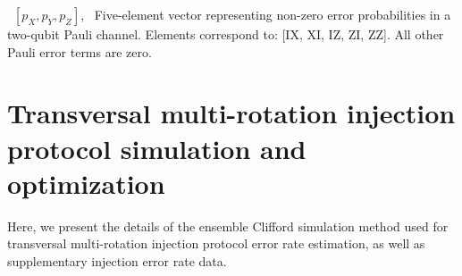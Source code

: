 \documentclass[aps, prx, reprint, superscriptaddress, longbibliography, floatfix]{revtex4-2}
\begin{document}
\begin{table}[htbp]
\centering
\caption{Extracted logical noise model for Clifford operations in distance-7 surface code. Simulations performed at physical error rate $p_{\text{ph}} \approx 7.3 \times 10^{-4}$ (10$\times$ improvement over current experimental noise rates).}
\vspace{2pt}
\dag~$[p_X,p_Y,p_Z]$, \quad
\ddag~Five-element vector representing non-zero error probabilities in a two-qubit Pauli channel. Elements correspond to: [IX, XI, IZ, ZI, ZZ]. All other Pauli error terms are zero.

\vspace{-4pt}

\end{table}


\section{Transversal multi-rotation injection protocol simulation and optimization}

Here, we present the details of the ensemble Clifford simulation method used for transversal multi-rotation injection protocol error rate estimation, as well as supplementary injection error rate data.
\end{document}
